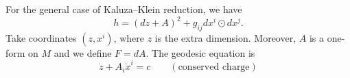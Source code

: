 For the general case of Kaluza--Klein reduction, we have
\begin{equation}
  h = (dz + A)^2 + g_{ij} dx^{i} \odot dx^{j}.
\end{equation}
Take coordinates $(z, x^{i})$, where $z$ is the extra dimension.
Moreover, $A$ is a one-form on $M$ and we define $F = dA$.
The geodesic equation is
\begin{equation}
  \dot{z} + A_{i} \dot{x}^{i} = c \qquad  (\text{conserved charge})
\end{equation}
